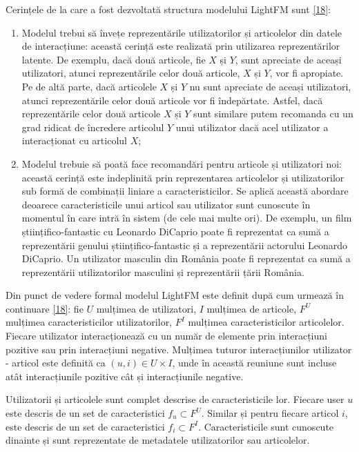 \vspace{5mm}
Cerințele de la care a fost dezvoltată structura modelului LightFM sunt \hyperlink{maciejlightfm}{[18]}:
\begin{enumerate}
	\item Modelul trebui să învețe reprezentările utilizatorilor și articolelor din datele de interacțiune: această cerință este realizată prin utilizarea reprezentărilor latente. De exemplu, dacă două articole, fie $X$ și $Y$, sunt apreciate de aceași utilizatori, atunci reprezentările celor două articole, $X$ și $Y$, vor fi apropiate. Pe de altă parte, dacă articolele $X$ și $Y$ nu sunt apreciate de aceași utilizatori, atunci reprezentările celor două articole vor fi îndepărtate. Astfel, dacă reprezentările celor două articole $X$ și $Y$ sunt similare putem recomanda cu un grad ridicat de încredere articolul $Y$ unui utilizator dacă acel utilizator a interacționat cu articolul $X$;
	\item Modelul trebuie să poată face recomandări pentru articole și utilizatori noi: această cerință este indeplinită prin reprezentarea articolelor și utilizatorilor sub formă de combinații liniare a caracteristicilor. Se aplică această abordare deoarece caracteristicile unui articol sau utilizator sunt cunoscute în momentul în care intră în sistem (de cele mai multe ori). De exemplu, un film științifico-fantastic cu Leonardo DiCaprio poate fi reprezentat ca sumă a reprezentării genului științifico-fantastic și a reprezentării actorului Leonardo DiCaprio. Un utilizator masculin din România poate fi reprezentat ca sumă a reprezentării utilizatorilor masculini și reprezentării țării România.
\end{enumerate}

\vspace{5mm}
Din punct de vedere formal modelul LightFM este definit după cum urmează în continuare \hyperlink{maciejlightfm}{[18]}: fie $U$ mulțimea de utilizatori, $I$ mulțimea de articole, $F^U$ mulțimea caracteristicilor utilizatorilor, $F^I$ mulțimea caracteristicilor articolelor. Fiecare utilizator interacționează cu un număr de elemente prin interacțiuni pozitive sau prin interacțiuni negative. Mulțimea tuturor interacțiunilor utilizator - articol este definită ca $(u,i) \in U \times I$, unde în această reuniune sunt incluse atât interacțiunile pozitive cât și interacțiunile negative.

Utilizatorii și articolele sunt complet descrise de caracteristicile lor. Fiecare user $u$ este descris de un set de caracteristici $f_u \subset F^U$. Similar și pentru fiecare articol $i$, este descris de un set de caracteristici $f_i \subset F^I$. Caracteristicile sunt cunoscute dinainte și sunt reprezentate de metadatele utilizatorilor sau articolelor.

